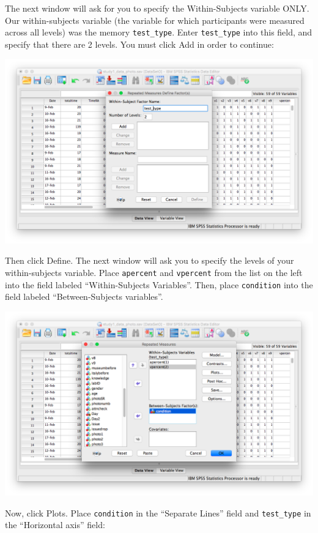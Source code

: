 \documentclass[
]{book}
\begin{document}
The next window will ask for you to specify the Within-Subjects variable ONLY. Our within-subjects variable (the variable for which participants were measured across all levels) was the memory \texttt{test\_type}. Enter \texttt{test\_type} into this field, and specify that there are 2 levels. You must click {Add} in order to continue:

\includegraphics{img/11.4.13.png}

Then click {Define}. The next window will ask you to specify the levels of your within-subjects variable. Place \texttt{apercent} and \texttt{vpercent} from the list on the left into the field labeled ``Within-Subjects Variables''. Then, place \texttt{condition} into the field labeled ``Between-Subjects variables''.

\includegraphics{img/11.4.14.png}

Now, click {Plots}. Place \texttt{condition} in the ``Separate Lines'' field and \texttt{test\_type} in the ``Horizontal axis'' field:
\end{document}
